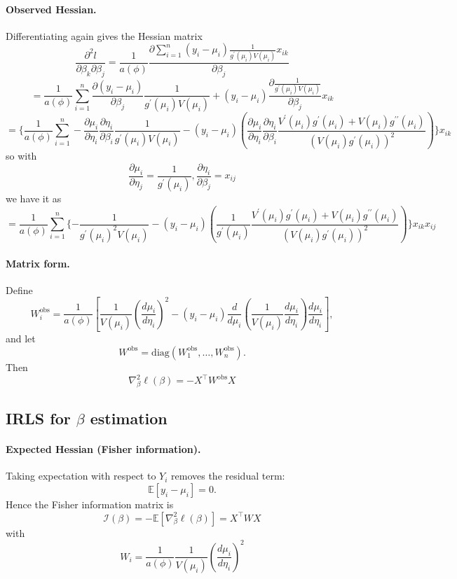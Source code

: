 \documentclass[11pt]{article}
\theoremstyle{definition}
\begin{document}
\paragraph{Observed Hessian.}
Differentiating again gives the Hessian matrix
\[
\frac{\partial^2 l}{\partial \beta_k \partial \beta_j} = \frac{1}{a(\phi)}
\frac{\partial\sum_{i=1}^n
(y_i - \mu_i)
\frac{1}{g^\prime(\mu_i)V(\mu_i)}x_{ik}}{\partial\beta_j} 
\]
\[
= \frac{1}{a(\phi)}
\sum_{i=1}^n\frac{\partial (y_i - \mu_i)}{\partial\beta_j}
\frac{1}{g^\prime(\mu_i)V(\mu_i)} + (y_i - \mu_i)
\frac{\partial\frac{1}{g^\prime(\mu_i)V(\mu_i)}}{\partial\beta_j}x_{ik}
\]
\[
=\{\frac{1}{a(\phi)}\sum_{i=1}^n-\frac{\partial\mu_i}{\partial\eta_i}\frac{\partial\eta_i}{\partial\beta_i}\frac{1}{g^\prime(\mu_i)V(\mu_i)}-(y_i-\mu_i)(\frac{\partial\mu_i}{\partial\eta_i}\frac{\partial\eta_i}{\partial\beta_i}\frac{V^\prime(\mu_i)g^\prime(\mu_i) + V(\mu_i)g^{\prime\prime}(\mu_i)}{(V(\mu_i)g^{\prime}(\mu_i))^2})\}x_{ik}
\]
so with
\[
\frac{\partial\mu_i}{\partial\eta_j}=\frac{1}{g^\prime(\mu_i)}, \frac{\partial\eta_i}{\partial\beta_j}=x_{ij}
\]
we have it as 
\[
=\frac{1}{a(\phi)}\sum_{i=1}^n\{-\frac{1}{g^\prime(\mu_i)^2V(\mu_i)}-(y_i-\mu_i)(\frac{1}{g^\prime(\mu_i)}\frac{V^\prime(\mu_i)g^\prime(\mu_i) + V(\mu_i)g^{\prime\prime}(\mu_i)}{(V(\mu_i)g^{\prime}(\mu_i))^2})\}x_{ik}x_{ij}
\]
\paragraph{Matrix form.}
Define
\[
W_i^{\text{obs}}
=
\frac{1}{a(\phi)}
\left[
\frac{1}{V(\mu_i)}
\left(\frac{d\mu_i}{d\eta_i}\right)^2
-
(y_i-\mu_i)
\frac{d}{d\mu_i}
\left(
\frac{1}{V(\mu_i)}
\frac{d\mu_i}{d\eta_i}
\right)
\frac{d\mu_i}{d\eta_i}
\right],
\]
and let
\[
W^{\text{obs}} = \mathrm{diag}(W_1^{\text{obs}},\dots,W_n^{\text{obs}}).
\]
Then
\[
\boxed{
\nabla_\beta^2 \ell(\beta)
=
- X^\top W^{\text{obs}} X
}
\]
\subsection{IRLS for $\beta$ estimation}
\paragraph{Expected Hessian (Fisher information).}
Taking expectation with respect to $Y_i$ removes the residual term:
\[
\mathbb{E}[y_i-\mu_i]=0.
\]
Hence the Fisher information matrix is
\[
\boxed{
\mathcal{I}(\beta)
=
- \mathbb{E}[\nabla_\beta^2 \ell(\beta)]
=
X^\top W X
}
\]
with
\[
\boxed{
W_i
=
\frac{1}{a(\phi)}
\frac{1}{V(\mu_i)}
\left(\frac{d\mu_i}{d\eta_i}\right)^2
}
\]
\end{document}
